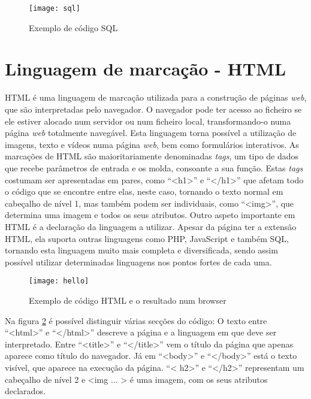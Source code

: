 \begin{figure}[hbtp]
	\centering
	\texttt{[image: sql]}
	\caption{Exemplo de código SQL}
	\label{fig:sql}
\end{figure}

\section{Linguagem de marcação - HTML}
\label{sec:html}

HTML é uma linguagem de marcação utilizada para a construção de páginas \emph{web}, que são interpretadas pelo navegador.
O navegador pode ter acesso ao ficheiro se ele estiver alocado num servidor ou num ficheiro local, transformando-o numa página \emph{web} totalmente navegável.
Esta linguagem torna possível a utilização de imagens, texto e vídeos numa página \emph{web}, bem como formulários interativos.
As marcações de HTML são maioritariamente denominadas \emph{tags}, um tipo de dados que recebe parâmetros de entrada e os molda, consoante a sua função.
Estas \emph{tags} costumam ser apresentadas em pares, como ``<h1>'' e ``</h1>'' que afetam todo o código que se encontre entre elas, neste caso, tornando o texto normal em cabeçalho de nível 1, mas também podem ser individuais, como ``<img>'', que determina uma imagem e todos os seus atributos.
Outro aspeto importante em HTML é a declaração da linguagem a utilizar.
Apesar da página ter a extensão HTML, ela suporta outras linguagens como PHP, JavaScript e também SQL, tornando esta linguagem muito mais completa e diversificada, sendo assim possível utilizar determinadas linguagens nos pontos fortes de cada uma.

\begin{figure}[hbtp]
	\centering
	\texttt{[image: hello]}
	\caption{Exemplo de código HTML e o resultado num browser}
	\label{fig:hello}
\end{figure}

Na figura \ref{fig:hello} é possível distinguir várias secções do código:
O texto entre ``<html>'' e ``</html>'' descreve a página e a linguagem em que deve ser interpretado.
Entre ``<title>'' e ``</title>'' vem o título da página que apenas aparece como título do navegador.
Já em ``<body>'' e ``</body>'' está o texto visível, que aparece na execução da página.
``< h2>'' e ``</h2>'' representam um cabeçalho de nível 2 e <img ... > é uma imagem, com os seus atributos declarados.